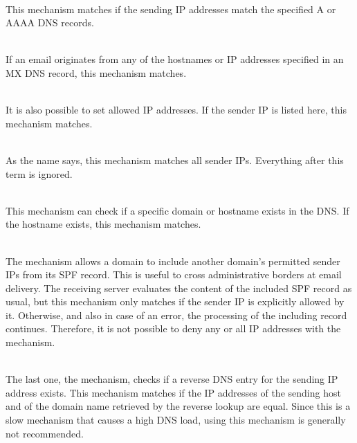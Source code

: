 \begin{description}
\setlength{\itemsep}{2pt}
\item[\spfcode{a}] \hfill \\
This mechanism matches if the sending IP addresses match the specified A or AAAA DNS records.

\item[\spfcode{mx}]\hfill \\
If an email originates from any of the hostnames or IP addresses specified in an MX DNS record, this mechanism matches.

\item[\spfcode{ip4}, \spfcode{ip6}]\hfill \\
It is also possible to set allowed IP addresses.
If the sender IP is listed here, this mechanism matches.

\item[\spfcode{all}]\hfill \\
As the name says, this mechanism matches all sender IPs.
Everything after this term is ignored.

\item[\spfcode{exists}]\hfill \\
This mechanism can check if a specific domain or hostname exists in the DNS.
If the hostname exists, this mechanism matches.

\item[\spfcode{include}]\hfill \\
The  mechanism allows a domain to include another domain's permitted sender IPs from its SPF record.
This is useful to cross administrative borders at email delivery.
The receiving server evaluates the content of the included SPF record as usual, but this mechanism only matches if the sender IP is explicitly allowed by it.
Otherwise, and also in case of an error, the processing of the including record continues.
Therefore, it is not possible to deny any or all IP addresses with the  mechanism.

\item[\spfcode{ptr}]\hfill \\
The last one, the  mechanism, checks if a reverse DNS entry for the sending IP address exists.
This mechanism matches if the IP addresses of the sending host and of the domain name retrieved by the reverse lookup are equal.
Since this is a slow mechanism that causes a high DNS load, using this mechanism is generally not recommended.

\end{description}

